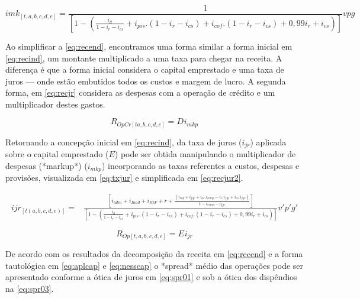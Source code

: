 \documentclass[
  12pt,
  12pt,
  openright,
  oneside,
  a4paper,
  chapter=TITLE,
  section=TITLE,
  subsection=TITLE,
  subsubsection=TITLE,
  portugues,
  sumario=tradicional]{abntex2}
\begin{document}
\begin{apendicesenv}
\begin{equation}\label{eq:denom}
imk_{[t,a,b,c,d,e]} = \frac{1}{[1 - (\frac{i_{ll}}{1 - i_{r} - i_{cs}} + i_{pis}.(1 - i_{r} - i_{cs}) + i_{cof}.(1 - i_{r} - i_{cs}) + 0,99i_{r} + i_{cs})]}vpg
\end{equation}



Ao simplificar a \autoref{eq:recend}, encontramos uma forma similar a forma inicial em \autoref{eq:recind}, um montante multiplicado a uma taxa para chegar na receita. A diferença é que a forma inicial considera o capital emprestado e uma taxa de juros — onde estão embutidos todos os custos e margem de lucro. A segunda forma, em \autoref{eq:recjr} considera as despesas com a operação de crédito e um multiplicador destes gastos.



\begin{equation}\label{eq:recjr}
R_{OpCr[ta,b,c,d,e]} = D_{} i_{mkp}
\end{equation}



Retornando a concepção inicial em \autoref{eq:recind}, da taxa de juros ($i_{jr}$) aplicada sobre o capital emprestado ($E$) pode ser obtida manipulando o multiplicador de despesas (*markup*) ($i_{mkp}$) incorporando as taxas referentes a custos, despesas e provisões, visualizada em \autoref{eq:txjur} e simplificada em \autoref{eq:recjur2}.



\begin{equation}\label{eq:txjur}
\begin{aligned}
ijr_{[t(a,b,c,d,e)]} = & \frac{[i_{adm} + i_{Inad} + i_{IOF} + r +  \frac{(i_{cap} + i_{fgc} + i_{ac}.i_{comp} - i_{r}.i_{fgc}+ i_{cs}.i_{fgc})}{1 - i_{comp} - i_{fgc}}]}
{[1 - (\frac{i_{ll}}{1 - i_{r} - i_{cs}} + i_{pis}.(1 - i_{r} - i_{cs}) + i_{cof}.(1 - i_{r} - i_{cs}) + 0,99i_{r} + i_{cs})]}v'p'g'
\end{aligned}
\end{equation}




\begin{equation}\label{eq:recjr}
R_{Op[t,a,b,c,d,e]} = E_{}i_{jr}
\end{equation}


De acordo com os resultados da decomposição da receita em \autoref{eq:recend} e a forma tautológica em \autoref{eq:aplcap} e \autoref{eq:nesscap} o *spread* médio das operações pode ser apresentado conforme a ótica de juros em \autoref{eq:spr01} e sob a ótica dos dispêndios na \autoref{eq:spr03}. 


\end{apendicesenv}
\end{document}
